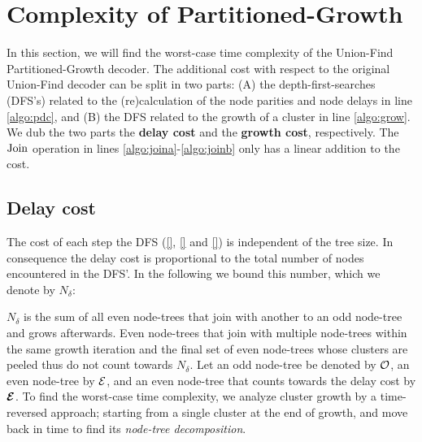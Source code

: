 
\section{Complexity of Partitioned-Growth}\label{sec:complexity}

In this section, we will find the worst-case time complexity of the Union-Find Partitioned-Growth decoder. The additional cost with respect to the original Union-Find decoder can be split in two parts: (A) the depth-first-searches (DFS's) related to the (re)calculation of the node parities and node delays in line \ref{algo:pdc}, and (B) the DFS related to the growth of a cluster in line \ref{algo:grow}. We dub the two parts the \textbf{delay cost} and the \textbf{growth cost}, respectively. The $\operatorname{Join}$ operation in lines \ref{algo:joina}-\ref{algo:joinb} only has a linear addition to the cost.

\subsection{Delay cost}\label{sec:suscomplexity}
The cost of each step the DFS (\eqref{}, \eqref{} and \eqref{}) is independent of the tree size. In consequence the delay cost is proportional to the total number of nodes encountered in the DFS'. In the following we bound this number, which we denote by $N_\delta$: 

$N_\delta$ is the sum of all even node-trees that join with another to an odd node-tree and grows afterwards. Even node-trees that join with multiple node-trees within the same growth iteration and the final set of even node-trees whose clusters are peeled thus do not count towards $N_\delta$. Let an odd node-tree be denoted by $\mathcal{O}$, an even node-tree by $\mathcal{E}$, and an even node-tree that counts towards the delay cost by $\bm{\mathcal{E}}$. To find the worst-case time complexity, we analyze cluster growth by a time-reversed approach; starting from a single cluster at the end of growth, and move back in time to find its \emph{node-tree decomposition}.



